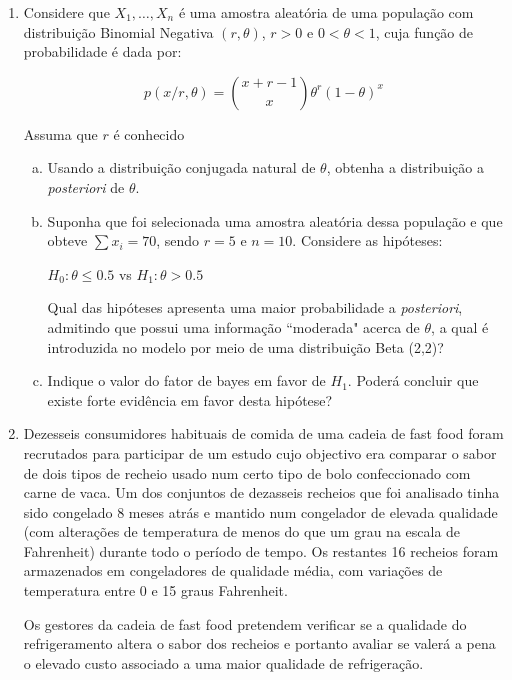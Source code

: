 \documentclass[10pt,brazil,addpoints]{exam}
\begin{document}
\begin{enumerate}[1.]


\item  Considere que $X_1, \ldots, X_n$ é uma amostra aleatória de uma população com distribuição Binomial Negativa $(r, \theta)$, $r>0$ e $0<\theta<1$, cuja função de probabilidade é dada por:

$$
p(x/ r, \theta) = {x+r-1 \choose x}\theta^r(1-\theta)^x
$$

Assuma que $r$ é conhecido

\begin{enumerate}[a)]

\item Usando a distribuição conjugada natural de $\theta$, obtenha a distribuição a \textit{posteriori} de $\theta$.

\item Suponha que foi selecionada uma amostra aleatória dessa população e que obteve $\sum x_i=70$, sendo $r=5$ e $n=10$. Considere as hipóteses:

$H_0: \theta \leq 0.5$ vs $H_1: \theta > 0.5$

Qual das hipóteses apresenta uma maior probabilidade a \textit{posteriori}, admitindo que possui uma informação ``moderada" acerca de $\theta$, a qual é introduzida no modelo por meio de uma distribuição Beta (2,2)?

\item Indique o valor do fator de bayes em favor de $H_1$. Poderá concluir que existe forte evidência em favor desta hipótese?

\end{enumerate}

\item Dezesseis consumidores habituais de comida de uma cadeia de fast food foram recrutados
para participar de um estudo cujo objectivo era comparar o sabor de dois tipos de recheio usado num certo tipo de bolo confeccionado com carne de vaca. Um
dos conjuntos de dezasseis recheios que foi analisado tinha sido congelado 8 meses
atrás e mantido num congelador de elevada qualidade (com alterações de temperatura de menos do que um grau na escala de Fahrenheit) durante todo o período de
tempo. Os restantes 16 recheios foram armazenados em congeladores de qualidade média, com variações de temperatura entre 0 e 15 graus Fahrenheit. 

Os gestores da
cadeia de fast food pretendem verificar se a qualidade do refrigeramento altera o sabor
dos recheios e portanto avaliar se valerá a pena o elevado custo associado a uma maior qualidade de refrigeração.


\end{enumerate}
\end{document}
